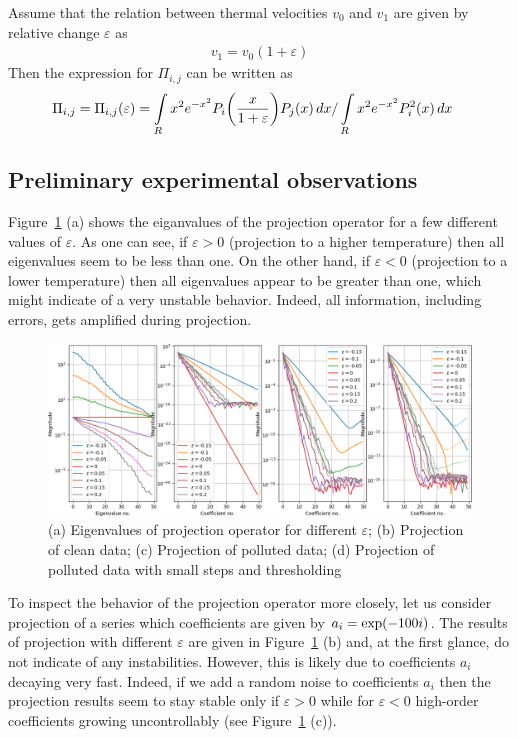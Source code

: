\documentclass{article}
\newcommand{\myint}{\int\limits}
\newcommand{\diff}[1]{\, d#1}
\newcommand{\of}[1]{\mleft( #1 \mright)}
\begin{document}
Assume that the relation between thermal velocities $v_0$ and $v_1$ are given by relative change $\varepsilon$ as
\begin{align*}
v_1 = v_0 \left( 1 + \varepsilon \right)
\end{align*}
Then the expression for $\Pi_{i,j}$ can be written as
\begin{align*}
\Pi_{i,j} = \Pi_{i,j} \of{\varepsilon}
&= \myint_{R} x^2 e^{-x^2} P_i\of{\frac{x}{ 1 + \varepsilon }} P_j\of{x} \diff{x} / \myint_{R} x^2 e^{-x^2} P^2_i\of{x} \diff{x}
\end{align*}

\subsection{Preliminary experimental observations}

Figure~\ref{fig:projection} (a) shows the eiganvalues of the projection operator for a few different values of $\varepsilon$. As one can see, if $\varepsilon > 0$ (projection to a higher temperature) then all eigenvalues seem to be less than one. On the other hand, if $\varepsilon < 0$ (projection to a lower temperature) then all eigenvalues appear to be greater than one, which might indicate of a very unstable behavior. Indeed, all information, including errors, gets amplified during projection. 

\begin{figure}[H]
\label{fig:projection}
\centering
\includegraphics[width=\textwidth]{dat/projection_different_eps.png}
\caption{(a) Eigenvalues of projection operator for different $\varepsilon$; (b) Projection of clean data; (c) Projection of polluted data; (d) Projection of polluted data with small steps and thresholding}
\end{figure}

To inspect the behavior of the projection operator more closely, let us consider projection of a series which coefficients are given by $a_i = \exp\of{-100i}$. The results of projection with different $\varepsilon$ are given in Figure~\ref{fig:projection} (b) and, at the first glance, do not indicate of any instabilities. However, this is likely due to coefficients $a_i$ decaying very fast. Indeed, if we add a random noise to coefficients $a_i$ then the projection results seem to stay stable only if $\varepsilon > 0$ while for $\varepsilon < 0$ high-order coefficients growing uncontrollably (see Figure~\ref{fig:projection} (c)). 
\end{document}
